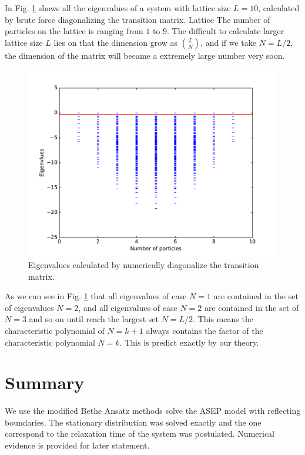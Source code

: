 \documentclass[12pt,a4paper]{article}
\begin{document}
In Fig.  \ref{fig:eigenvalues} shows all the eigenvalues of a system with
lattice size $L=10$, calculated by brute force diagonalizing the transition
matrix.  Lattice The number of particles on the lattice is ranging from $1$ to
$9$. The difficult to calculate larger lattice size $L$ lies on that the
dimension grow as $\binom{L}{N}$, and if we take $N=L/2$, the dimension of the
matrix will became a extremely large number very soon. 

\begin{figure}[htpb]
    \centering
    \includegraphics[width=0.8\linewidth]{eigenvalues}
    \caption{Eigenvalues calculated by numerically diagonalize the transition
        matrix.}
    \label{fig:eigenvalues}
\end{figure}

As we can see in Fig. \ref{fig:eigenvalues}
that all eigenvalues of case $N=1$ are contained in the set of
eigenvalues $N=2$, and all eigenvalues of case $N=2$ are contained in the set
of $N=3$ and so on until reach the largest set $N=L/2$. This means the
characteristic polynomial of $N=k+1$ always contains the factor of the
characteristic polynomial $N=k$. This is predict exactly by our theory. 

\section{Summary}
\label{sec:summeary}
We use the modified Bethe Ansatz methods solve the ASEP model with reflecting
boundaries.  The stationary distribution was solved exactly and the one
correspond to the relaxation time of the system was postulated. Numerical
evidence is provided for later statement.

\newpage

\appendix
\end{document}
